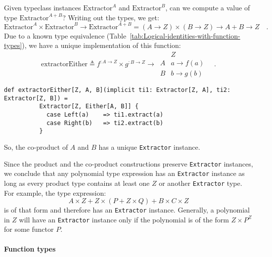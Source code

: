 Given typeclass instances $\text{Extractor}^{A}$ and $\text{Extractor}^{B}$,
can we compute a value of type $\text{Extractor}^{A+B}$? Writing
out the types, we get:
\[
\text{Extractor}^{A}\times\text{Extractor}^{B}\rightarrow\text{Extractor}^{A+B}=\left(A\rightarrow Z\right)\times\left(B\rightarrow Z\right)\rightarrow A+B\rightarrow Z\quad.
\]
Due to a known type equivalence (Table~\ref{tab:Logical-identities-with-function-types}),
we have a unique implementation of this function:
\[
\text{extractorEither}\triangleq f^{:A\rightarrow Z}\times g^{:B\rightarrow Z}\rightarrow\,\begin{array}{|c||c|}
 & Z\\
\hline A & a\rightarrow f(a)\\
B & b\rightarrow g(b)
\end{array}\quad.
\]
\begin{lstlisting}
def extractorEither[Z, A, B](implicit ti1: Extractor[Z, A], ti2: Extractor[Z, B]) =
          Extractor[Z, Either[A, B]] {
            case Left(a)    => ti1.extract(a)
            case Right(b)   => ti2.extract(b)
          }
\end{lstlisting}
So, the co-product of $A$ and $B$ has a unique \lstinline!Extractor!
instance.

Since the product and the co-product constructions preserve \lstinline!Extractor!
instances, we conclude that any polynomial type expression has an
\lstinline!Extractor! instance as long as every product type contains
at least one $Z$ or another \lstinline!Extractor! type. For example,
the type expression: 
\[
A\times Z+Z\times(P+Z\times Q)+B\times C\times Z
\]
is of that form and therefore has an \lstinline!Extractor! instance.
Generally, a polynomial in $Z$ will have an \lstinline!Extractor!
instance only if the polynomial is of the form $Z\times P^{Z}$ for
some functor $P$.

\paragraph{Function types}

